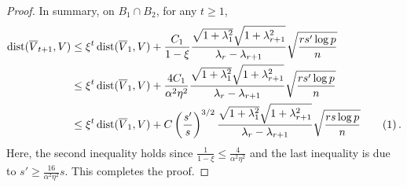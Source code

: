 \documentclass[11pt]{article}
\newcommand\numberthis{\addtocounter{equation}{1}\tag{\theequation}}
\newcommand{\scale}{V}
\newcommand{\gd}{\overline{V}}
\newcommand{\0}{{\mathbf{0}}}
\begin{document}
\begin{proof}
In summary, on $B_1\cap B_2$, for any $t\geq 1$,
\begin{align*}
\mathrm{dist}(\gd_{t+1},\scale)
& \leq\xi^t\,\mathrm{dist}(\gd_1,\scale)
+\frac{C_1}{1-\xi}
\frac{\sqrt{1+\lambda_1^2}\sqrt{{1+\lambda_{r+1}^2}}}{\lambda_r-\lambda_{r+1}}\sqrt{\frac{rs'\log p}{n}}\\
& \leq\xi^t\,\mathrm{dist}(\gd_1,\scale)
+\frac{4C_1}{\alpha^2\eta^2}
\frac{\sqrt{1+\lambda_1^2}\sqrt{{1+\lambda_{r+1}^2}}}{\lambda_r-\lambda_{r+1}}\sqrt{\frac{rs'\log p}{n}}\\
& \leq \xi^t \, \mathrm{dist}(\gd_1,\scale)+C\left(\frac{s'}{s}\right)^{3/2}\frac{\sqrt{1+\lambda_1^2}\sqrt{{1+\lambda_{r+1}^2}}}{\lambda_r-\lambda_{r+1}}\sqrt{\frac{rs\log p}{n}}\numberthis \label{eq:condition_s_prime_2}\,.
\end{align*}
Here, the second inequality holds since $\frac{1}{1-\xi}\leq \frac{4}{\alpha^2\eta^2}$ and the last inequality is due to $s' \geq \frac{16}{\alpha^2\eta^2}s$.
This completes the proof.
\end{proof}

\end{document}
